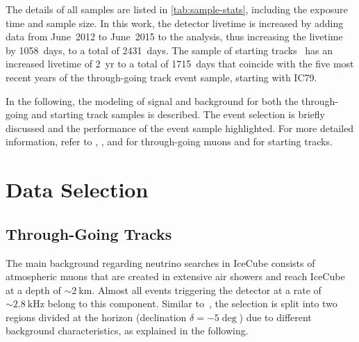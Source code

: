 \documentclass[aps,10pt,prd,twocolumn,floats,letterpaper,showpacs,nofootinbib,bibnotes,notitlepage,superscriptaddress]{revtex4-1}
\begin{document}
The details of all samples are listed in \ref{tab:sample-stats}, including
the exposure time and sample size. In this work, the detector livetime is
increased by adding data from June~2012 to June~2015 to the analysis, thus
increasing the livetime by 1058~days, to a total of 2431~days. The sample of
starting tracks~\citep{Aartsen:2016tpb} has an increased livetime of 2~yr to
a total of 1715~days that coincide with the five most recent years of the
through-going track event sample, starting with IC79.

In the following, the modeling of signal and background for both the
through-going and starting track samples is described.  The event selection is
briefly discussed and the performance of the event sample highlighted. For more
detailed information, refer to \cite{Abbasi:2010rd}, \cite{Aartsen:2013uuv},
and \cite{Aartsen:2014cva} for through-going muons and \cite{Aartsen:2016tpb}
for starting tracks.

\section{Data Selection}

\subsection{Through-Going Tracks}

The main background regarding neutrino searches in IceCube consists of
atmospheric muons that are created in extensive air showers and reach IceCube
at a depth of $\sim2\:\mathrm{km}$.  Almost all events triggering the detector
at a rate of $\sim2.8\:\mathrm{kHz}$ belong to this component. Similar
to~\cite{Aartsen:2014cva}, the selection is split into two regions divided at
the horizon (declination $\delta=-5\deg$) due to different background
characteristics, as explained in the following.
\end{document}
